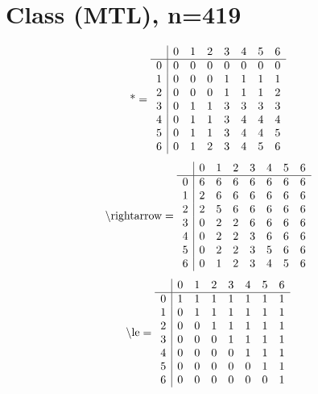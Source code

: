 \documentclass[11pt]{article}
\begin{document}
\section{Class (MTL), n=419}
\[\text{*} = 
\begin{array}{r | r r r r r r r}
 & 0 & 1 & 2 & 3 & 4 & 5 & 6 \\ \hline
0 & 0 & 0 & 0 & 0 & 0 & 0 & 0 \\
1 & 0 & 0 & 0 & 1 & 1 & 1 & 1 \\
2 & 0 & 0 & 0 & 1 & 1 & 1 & 2 \\
3 & 0 & 1 & 1 & 3 & 3 & 3 & 3 \\
4 & 0 & 1 & 1 & 3 & 4 & 4 & 4 \\
5 & 0 & 1 & 1 & 3 & 4 & 4 & 5 \\
6 & 0 & 1 & 2 & 3 & 4 & 5 & 6 \\
\end{array}
\]
\[\text{\textbackslash rightarrow} = 
\begin{array}{r | r r r r r r r}
 & 0 & 1 & 2 & 3 & 4 & 5 & 6 \\ \hline
0 & 6 & 6 & 6 & 6 & 6 & 6 & 6 \\
1 & 2 & 6 & 6 & 6 & 6 & 6 & 6 \\
2 & 2 & 5 & 6 & 6 & 6 & 6 & 6 \\
3 & 0 & 2 & 2 & 6 & 6 & 6 & 6 \\
4 & 0 & 2 & 2 & 3 & 6 & 6 & 6 \\
5 & 0 & 2 & 2 & 3 & 5 & 6 & 6 \\
6 & 0 & 1 & 2 & 3 & 4 & 5 & 6 \\
\end{array}
\]
\[\text{\textbackslash le} = 
\begin{array}{r | r r r r r r r}
 & 0 & 1 & 2 & 3 & 4 & 5 & 6 \\ \hline
0 & 1 & 1 & 1 & 1 & 1 & 1 & 1 \\
1 & 0 & 1 & 1 & 1 & 1 & 1 & 1 \\
2 & 0 & 0 & 1 & 1 & 1 & 1 & 1 \\
3 & 0 & 0 & 0 & 1 & 1 & 1 & 1 \\
4 & 0 & 0 & 0 & 0 & 1 & 1 & 1 \\
5 & 0 & 0 & 0 & 0 & 0 & 1 & 1 \\
6 & 0 & 0 & 0 & 0 & 0 & 0 & 1 \\
\end{array}
\]
\end{document}
